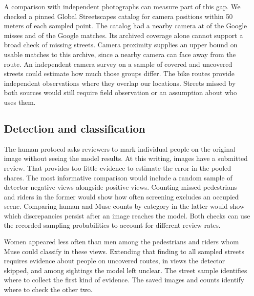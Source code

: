 \documentclass[11pt]{article}
\begin{document}
A comparison with independent photographs can measure part of this gap. We checked a pinned Global Streetscapes catalog for camera positions within 50 meters of each sampled point. The catalog had a nearby camera at \RefMissing{} of the \Misses{} Google misses and \RefPresent{} of the \Matches{} Google matches. Its archived coverage alone cannot support a broad check of missing streets. Camera proximity supplies an upper bound on usable matches to this archive, since a nearby camera can face away from the route. An independent camera survey on a sample of covered and uncovered streets could estimate how much those groups differ. The bike routes provide independent observations where they overlap our locations. Streets missed by both sources would still require field observation or an assumption about who uses them.

\subsection{Detection and classification}
The human protocol asks reviewers to mark individual people on the original image without seeing the model results. At this writing, \MWHumanReviews{} images have a submitted review. That provides too little evidence to estimate the error in the pooled shares. The most informative comparison would include a random sample of detector-negative views alongside positive views. Counting missed pedestrians and riders in the former would show how often screening excludes an occupied scene. Comparing human and Muse counts by category in the latter would show which discrepancies persist after an image reaches the model. Both checks can use the recorded sampling probabilities to account for different review rates.

Women appeared less often than men among the pedestrians and riders whom Muse could classify in these views. Extending that finding to all sampled streets requires evidence about people on uncovered routes, in views the detector skipped, and among sightings the model left unclear. The street sample identifies where to collect the first kind of evidence. The saved images and counts identify where to check the other two.



\end{document}
